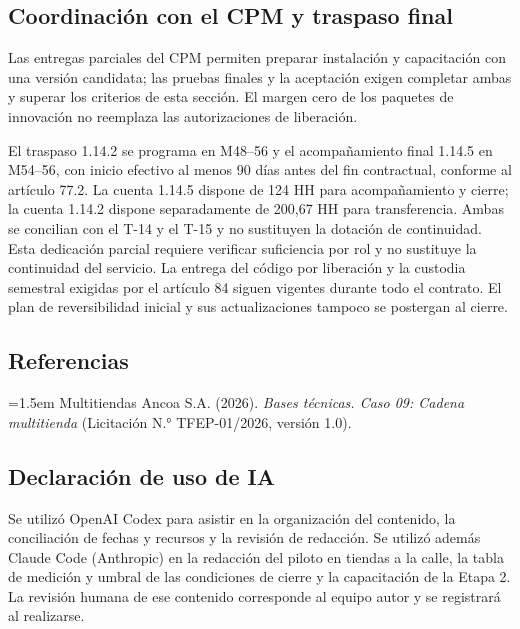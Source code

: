 \documentclass[11pt]{article}
\begin{document}
\subsection*{Coordinación con el CPM y traspaso final}

Las entregas parciales del CPM permiten preparar instalación y capacitación con una versión candidata; las pruebas finales y la aceptación exigen completar ambas y superar los criterios de esta sección. El margen cero de los paquetes de innovación no reemplaza las autorizaciones de liberación.

El traspaso 1.14.2 se programa en M48–56 y el acompañamiento final 1.14.5 en M54–56, con inicio efectivo al menos 90 días antes del fin contractual, conforme al artículo 77.2. La cuenta 1.14.5 dispone de 124 HH para acompañamiento y cierre; la cuenta 1.14.2 dispone separadamente de 200,67 HH para transferencia. Ambas se concilian con el T-14 y el T-15 y no sustituyen la dotación de continuidad. Esta dedicación parcial requiere verificar suficiencia por rol y no sustituye la continuidad del servicio. La entrega del código por liberación y la custodia semestral exigidas por el artículo 84 siguen vigentes durante todo el contrato. El plan de reversibilidad inicial y sus actualizaciones tampoco se postergan al cierre.

\subsection*{Referencias}

\noindent\hangindent=1.5em Multitiendas Ancoa S.A. (2026). \textit{Bases técnicas. Caso 09: Cadena multitienda} (Licitación N.° TFEP-01/2026, versión 1.0).

\subsection*{Declaración de uso de IA}

Se utilizó OpenAI Codex para asistir en la organización del contenido, la conciliación de fechas y recursos y la revisión de redacción. Se utilizó además Claude Code (Anthropic) en la redacción del piloto en tiendas a la calle, la tabla de medición y umbral de las condiciones de cierre y la capacitación de la Etapa 2. La revisión humana de ese contenido corresponde al equipo autor y se registrará al realizarse.



\ossFinalPage
\end{document}
